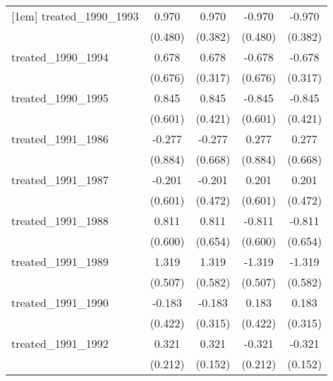 {\begin{tabular}{l*{4}{c}}
[1em]
treated\_1990\_1993&       0.970\sym{*}  &       0.970\sym{*}  &      -0.970\sym{*}  &      -0.970\sym{*}  \\
            &     (0.480)         &     (0.382)         &     (0.480)         &     (0.382)         \\
[1em]
treated\_1990\_1994&       0.678         &       0.678\sym{*}  &      -0.678         &      -0.678\sym{*}  \\
            &     (0.676)         &     (0.317)         &     (0.676)         &     (0.317)         \\
[1em]
treated\_1990\_1995&       0.845         &       0.845\sym{*}  &      -0.845         &      -0.845\sym{*}  \\
            &     (0.601)         &     (0.421)         &     (0.601)         &     (0.421)         \\
[1em]
treated\_1991\_1986&      -0.277         &      -0.277         &       0.277         &       0.277         \\
            &     (0.884)         &     (0.668)         &     (0.884)         &     (0.668)         \\
[1em]
treated\_1991\_1987&      -0.201         &      -0.201         &       0.201         &       0.201         \\
            &     (0.601)         &     (0.472)         &     (0.601)         &     (0.472)         \\
[1em]
treated\_1991\_1988&       0.811         &       0.811         &      -0.811         &      -0.811         \\
            &     (0.600)         &     (0.654)         &     (0.600)         &     (0.654)         \\
[1em]
treated\_1991\_1989&       1.319\sym{**} &       1.319\sym{*}  &      -1.319\sym{**} &      -1.319\sym{*}  \\
            &     (0.507)         &     (0.582)         &     (0.507)         &     (0.582)         \\
[1em]
treated\_1991\_1990&      -0.183         &      -0.183         &       0.183         &       0.183         \\
            &     (0.422)         &     (0.315)         &     (0.422)         &     (0.315)         \\
[1em]
treated\_1991\_1992&       0.321         &       0.321\sym{*}  &      -0.321         &      -0.321\sym{*}  \\
            &     (0.212)         &     (0.152)         &     (0.212)         &     (0.152)         \\

\end{tabular}}
